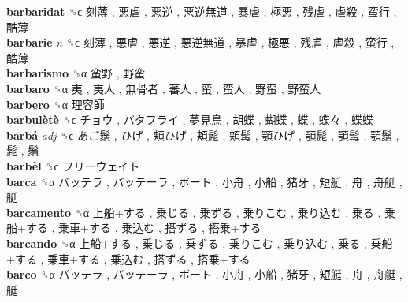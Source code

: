 \textbf{barbaridat} ␝ϲ   刻薄 ,  悪虐 ,  悪逆 ,  悪逆無道 ,  暴虐 ,  極悪 ,  残虐 ,  虐殺 ,  蛮行 ,  酷薄   \\
\textbf{barbarie} \emph{n}  ␝ϲ   刻薄 ,  悪虐 ,  悪逆 ,  悪逆無道 ,  暴虐 ,  極悪 ,  残虐 ,  虐殺 ,  蛮行 ,  酷薄   \\
\textbf{barbarismo} ␝α   蛮野 ,  野蛮   \\
\textbf{barbaro} ␝α   夷 ,  夷人 ,  無骨者 ,  蕃人 ,  蛮 ,  蛮人 ,  野蛮 ,  野蛮人   \\
\textbf{barbero} ␝α   理容師   \\
\textbf{barbulètè} ␝ϲ   チョウ ,  バタフライ ,  夢見鳥 ,  胡蝶 ,  蝴蝶 ,  蝶 ,  蝶々 ,  蝶蝶   \\
\textbf{barbá} \emph{adj}  ␝ϲ   あご鬚 ,  ひげ ,  頬ひげ ,  頬髭 ,  頬髯 ,  顎ひげ ,  顎髭 ,  顎髯 ,  顎鬚 ,  髭 ,  鬚   \\
\textbf{barbèl} ␝ϲ   フリーウェイト   \\
\textbf{barca} ␝α   バッテラ ,  バッテーラ ,  ボート ,  小舟 ,  小船 ,  猪牙 ,  短艇 ,  舟 ,  舟艇 ,  艇   \\
\textbf{barcamento} ␝α   上船+する ,  乗じる ,  乗ずる ,  乗りこむ ,  乗り込む ,  乗る ,  乗船+する ,  乗車+する ,  乗込む ,  搭ずる ,  搭乗+する   \\
\textbf{barcando} ␝α   上船+する ,  乗じる ,  乗ずる ,  乗りこむ ,  乗り込む ,  乗る ,  乗船+する ,  乗車+する ,  乗込む ,  搭ずる ,  搭乗+する   \\
\textbf{barco} ␝α   バッテラ ,  バッテーラ ,  ボート ,  小舟 ,  小船 ,  猪牙 ,  短艇 ,  舟 ,  舟艇 ,  艇   \\
